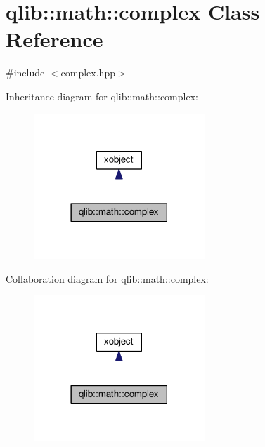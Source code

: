\hypertarget{classqlib_1_1math_1_1complex}{}\section{qlib\+:\+:math\+:\+:complex Class Reference}
\label{classqlib_1_1math_1_1complex}


{\ttfamily \#include $<$complex.\+hpp$>$}



Inheritance diagram for qlib\+:\+:math\+:\+:complex\+:\nopagebreak
\begin{figure}[H]
\begin{center}
\leavevmode
\includegraphics[width=182pt]{classqlib_1_1math_1_1complex__inherit__graph}
\end{center}
\end{figure}


Collaboration diagram for qlib\+:\+:math\+:\+:complex\+:\nopagebreak
\begin{figure}[H]
\begin{center}
\leavevmode
\includegraphics[width=182pt]{classqlib_1_1math_1_1complex__coll__graph}
\end{center}
\end{figure}
